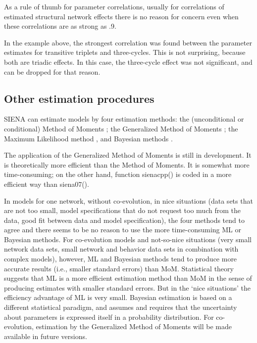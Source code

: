 \documentclass[a4paper,fleqn,11pt]{article}
\newcommand{\+}{\, + \,}
\newcommand{\sfn}[1]{\textsf{#1}}
\newcommand{\SI}{{\sf SIENA }}
\begin{document}
As a rule of thumb for parameter correlations,
usually for correlations of estimated structural network effects there is no
reason for concern even when these correlations
are as strong as .9.

In the example above, the strongest correlation was found between
the parameter estimates for transitive triplets and three-cycles.
This is not surprising, because both are triadic effects.
In this case, the three-cycle effect was not significant,
and can be dropped for that reason.

\subsection{Other estimation procedures}

\SI can estimate models by four estimation methods:
the (unconditional or conditional)
Method of Moments \citep*[`MoM', the default; ][]{Snijders01, SnijdersEA07};
the Generalized Method of Moments \citep*[`GMoM', see][]{ASS2015,ASS2019};
the Maximum Likelihood method \citep*[`ML', see][]{SnijdersEA10a},
and Bayesian methods
\citep[see][]{Koskinen04,KoskinenSnijders07,SchweinbergerSnijders07c,KoskinenSnijders20}.

The application of the Generalized Method of Moments is still in development.
It is theoretically more efficient than the Method of Moments.
It is somewhat more time-consuming; on the other hand, function \sfn{sienacpp()}
is coded in a more efficient way than \sfn{siena07()}.

In models for one network, without co-evolution,
in nice situations (data sets that are not too small, model specifications
that do not request too much from the data, good fit between data and
model specification), the four methods tend to agree
and there seems to be no reason to use the more time-consuming
ML or Bayesian methods.
For co-evolution models and not-so-nice situations (very small network data sets,
small network and behavior data sets in combination with complex models),
however, ML and Bayesian methods tend to produce more accurate results
(i.e., smaller standard errors) than MoM.
Statistical theory suggests that ML is a more efficient estimation method
than MoM in the sense of producing estimates with smaller standard errors.
But in the `nice situations' the efficiency advantage of ML is very small.
Bayesian estimation is based on a different statistical paradigm, and
assumes and requires that the uncertainty about parameters is expressed
itself in a probability distribution.
For co-evolution, estimation by the Generalized Method of Moments
will be made available in future versions.
\end{document}
